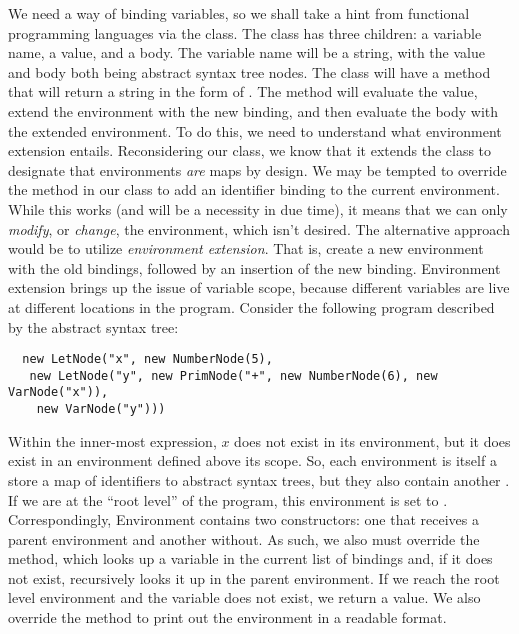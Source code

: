 We need a way of binding variables, so we shall take a hint from functional programming languages via the  class. The  class has three children: a variable name, a value, and a body. The variable name will be a string, with the value and body both being abstract syntax tree nodes. The  class will have a  method that will return a string in the form of . The  method will evaluate the value, extend the environment with the new binding, and then evaluate the body with the extended environment. To do this, we need to understand what environment extension entails. Reconsidering our  class, we know that it extends the  class to designate that environments \textit{are} maps by design. We may be tempted to override the  method in our  class to add an identifier binding to the current environment. While this works (and will be a necessity in due time), it means that we can only \textit{modify}, or \textit{change}, the environment, which isn't desired. The alternative approach would be to utilize \textit{environment extension}. That is, create a new environment with the old bindings, followed by an insertion of the new binding. Environment extension brings up the issue of variable scope, because different variables are live at different locations in the program. Consider the following program described by the abstract syntax tree:

\begin{verbatim}
  new LetNode("x", new NumberNode(5), 
   new LetNode("y", new PrimNode("+", new NumberNode(6), new VarNode("x")), 
    new VarNode("y")))
  \end{verbatim}
  
Within the inner-most  expression, $x$ does not exist in its environment, but it does exist in an environment defined above its scope. So, each environment is itself a store a map of identifiers to abstract syntax trees, but they also contain another . If we are at the ``root level'' of the program, this environment is set to . Correspondingly, Environment contains two constructors: one that receives a parent environment and another without. As such, we also must override the  method, which looks up a variable in the current list of bindings and, if it does not exist, recursively looks it up in the parent environment. If we reach the root level environment and the variable does not exist, we return a  value. We also override the  method to print out the environment in a readable format.

